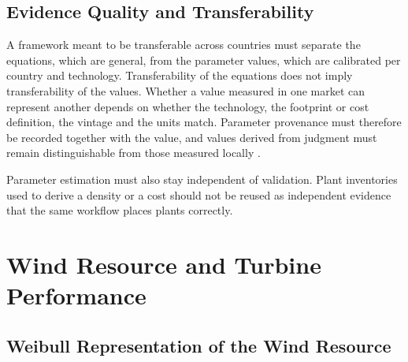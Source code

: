 \subsection{Evidence Quality and Transferability}
\label{subsec:evidence_quality}

A framework meant to be transferable across countries must separate the
equations, which are general, from the parameter values, which are
calibrated per country and technology. Transferability of the equations
does not imply transferability of the values. Whether a value measured
in one market can represent another depends on whether the technology,
the footprint or cost definition, the vintage and the units match.
Parameter provenance must therefore be recorded together with the value,
and values derived from judgment must remain distinguishable from those
measured locally \cite{heinrichs2026,mckenna2022}.

Parameter estimation must also stay independent of validation. Plant
inventories used to derive a density or a cost should not be reused as
independent evidence that the same workflow places plants correctly.

\section{Wind Resource and Turbine Performance}
\label{sec:wind_performance_theory}

\subsection{Weibull Representation of the Wind Resource}
\label{subsec:wind_weibull}

